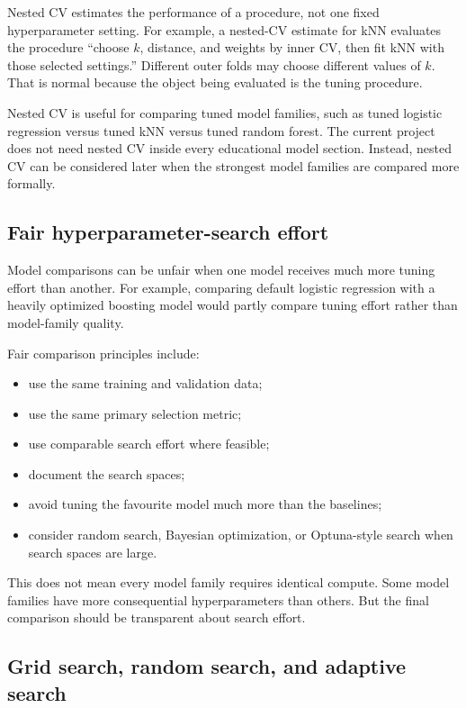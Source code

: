 Nested CV estimates the performance of a procedure, not one fixed hyperparameter setting. For example, a nested-CV estimate for kNN evaluates the procedure ``choose \(k\), distance, and weights by inner CV, then fit kNN with those selected settings.'' Different outer folds may choose different values of \(k\). That is normal because the object being evaluated is the tuning procedure.

Nested CV is useful for comparing tuned model families, such as tuned logistic regression versus tuned kNN versus tuned random forest. The current project does not need nested CV inside every educational model section. Instead, nested CV can be considered later when the strongest model families are compared more formally.

\subsection{Fair hyperparameter-search effort}

Model comparisons can be unfair when one model receives much more tuning effort than another. For example, comparing default logistic regression with a heavily optimized boosting model would partly compare tuning effort rather than model-family quality.

Fair comparison principles include:
\begin{itemize}
    \item use the same training and validation data;
    \item use the same primary selection metric;
    \item use comparable search effort where feasible;
    \item document the search spaces;
    \item avoid tuning the favourite model much more than the baselines;
    \item consider random search, Bayesian optimization, or Optuna-style search when search spaces are large.
\end{itemize}

This does not mean every model family requires identical compute. Some model families have more consequential hyperparameters than others. But the final comparison should be transparent about search effort.

\subsection{Grid search, random search, and adaptive search}

